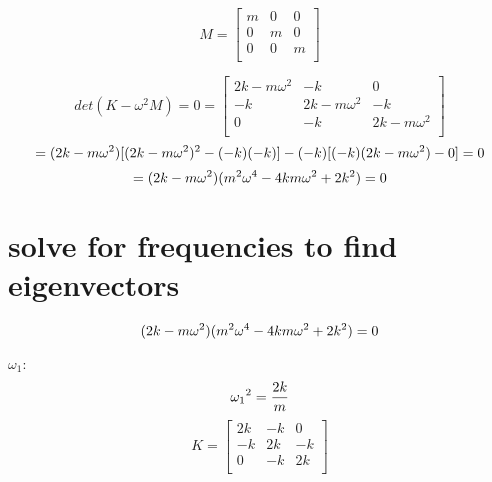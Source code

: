 \documentclass[11pt, oneside]{article}   	%
\begin{document}
\begin{equation}
M=
\begin{bmatrix}
    m & 0 & 0 \\
    0 & m & 0 \\
    0 & 0 & m \\
\end{bmatrix}
\end{equation}

\begin{equation}
det(K - \omega^2M) = 0 =
\begin{bmatrix}
    2k - m\omega^2  & -k & 0 \\
    -k  & 2k - m\omega^2 & -k \\
    0   & -k & 2k - m\omega^2 \\
\end{bmatrix}
\end{equation}
\begin{equation}
= (2k - m\omega^2)[(2k - m\omega^2)^2 - (-k)(-k)]-(-k)[(-k)(2k - m\omega^2) - 0] = 0 \\
\end{equation}
\begin{equation}
=(2k - m\omega^2)(m^2\omega^4 - 4km\omega^2 + 2k^2) = 0\\
\end{equation}


\section{solve for frequencies to find eigenvectors}

\begin{equation}
(2k - m\omega^2)(m^2\omega^4 - 4km\omega^2 + 2k^2) = 0 \\
\end{equation}

$\omega_1$: \\
\begin{equation}
{\omega_1}^2 = \frac{2k}{m}\\
\end{equation}
\begin{equation}
K=
\begin{bmatrix}
    2k  & -k & 0 \\
    -k  & 2k & -k \\
    0   & -k & 2k \\
\end{bmatrix}
\end{equation}
\end{document}
